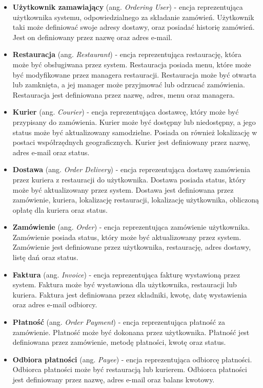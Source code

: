 \begin{itemize}

    \item \textbf{Użytkownik zamawiający} (ang. \textit{Ordering User}) - encja reprezentująca użytkownika systemu, odpowiedzialnego za składanie zamówień. Użytkownik taki może definiować swoje adresy dostawy, oraz posiadać historię zamówień. Jest on definiowany przez nazwę oraz adres e-mail.
    \item \textbf{Restauracja} (ang. \textit{Restaurant}) - encja reprezentująca restaurację, która może być obsługiwana przez system. Restauracja posiada menu, które może być modyfikowane przez managera restauracji. Restauracja może być otwarta lub zamknięta, a jej manager może przyjmować lub odrzucać zamówienia. Restauracja jest definiowana przez nazwę, adres, menu oraz managera.
    \item \textbf{Kurier} (ang. \textit{Courier}) - encja reprezentująca dostawcę, który może być przypisany do zamówienia. Kurier może być dostępny lub niedostępny, a jego status może być aktualizowany samodzielne. Posiada on również lokalizację w postaci współrzędnych geograficznych. Kurier jest definiowany przez nazwę, adres e-mail oraz status.
    \item \textbf{Dostawa} (ang. \textit{Order Delivery}) - encja reprezentująca dostawę zamówienia przez kuriera z restauracji do użytkownika. Dostawa posiada status, który może być aktualizowany przez system. Dostawa jest definiowana przez zamówienie, kuriera, lokalizację restauracji, lokalizację użytkownika, obliczoną opłatę dla kuriera oraz status.
    \item \textbf{Zamówienie} (ang. \textit{Order}) - encja reprezentująca zamówienie użytkownika. Zamówienie posiada status, który może być aktualizowany przez system. Zamówienie jest definiowane przez użytkownika, restaurację, adres dostawy, listę dań oraz status.
    \item \textbf{Faktura} (ang. \textit{Invoice}) - encja reprezentująca fakturę wystawioną przez system. Faktura może być wystawiona dla użytkownika, restauracji lub kuriera. Faktura jest definiowana przez składniki, kwotę, datę wystawienia oraz adres e-mail odbiorcy.
    \item \textbf{Płatność} (ang. \textit{Order Payment}) - encja reprezentująca płatność za zamówienie. Płatność może być dokonana przez użytkownika. Płatność jest definiowana przez zamówienie, metodę płatności, kwotę oraz status.
    \item \textbf{Odbiora płatności} (ang. \textit{Payee}) - encja reprezentująca odbiorcę płatności. Odbiorca płatności może być restauracją lub kurierem. Odbiorca płatności jest definiowany przez nazwę, adres e-mail oraz balans kwotowy.

\end{itemize}
